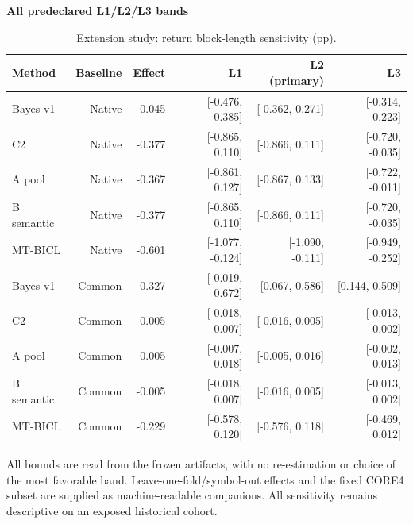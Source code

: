 \begin{table}[!htb]
\centering\small
\setlength{\tabcolsep}{3pt}
\renewcommand{\arraystretch}{1.12}
\caption{Extension study: return block-length sensitivity (pp).}
\label{tab:u09-sensitivity-return}
\textbf{All predeclared L1/L2/L3 bands}\par\smallskip
\begin{tabular}{lrrrrr}
\hline
Method & Baseline & Effect & L1 & L2 (primary) & L3 \\
\hline
Bayes v1 & Native & -0.045 & [-0.476, 0.385] & [-0.362, 0.271] & [-0.314, 0.223] \\
C2 & Native & -0.377 & [-0.865, 0.110] & [-0.866, 0.111] & [-0.720, -0.035] \\
A pool & Native & -0.367 & [-0.861, 0.127] & [-0.867, 0.133] & [-0.722, -0.011] \\
B semantic & Native & -0.377 & [-0.865, 0.110] & [-0.866, 0.111] & [-0.720, -0.035] \\
MT-BICL & Native & -0.601 & [-1.077, -0.124] & [-1.090, -0.111] & [-0.949, -0.252] \\
Bayes v1 & Common & 0.327 & [-0.019, 0.672] & [0.067, 0.586] & [0.144, 0.509] \\
C2 & Common & -0.005 & [-0.018, 0.007] & [-0.016, 0.005] & [-0.013, 0.002] \\
A pool & Common & 0.005 & [-0.007, 0.018] & [-0.005, 0.016] & [-0.002, 0.013] \\
B semantic & Common & -0.005 & [-0.018, 0.007] & [-0.016, 0.005] & [-0.013, 0.002] \\
MT-BICL & Common & -0.229 & [-0.578, 0.120] & [-0.576, 0.118] & [-0.469, 0.012] \\
\hline
\end{tabular}\par\medskip
\begin{minipage}{\textwidth}\footnotesize All bounds are read from the frozen artifacts, with no re-estimation or choice of the most favorable band. Leave-one-fold/symbol-out effects and the fixed CORE4 subset are supplied as machine-readable companions. All sensitivity remains descriptive on an exposed historical cohort.\end{minipage}
\end{table}
